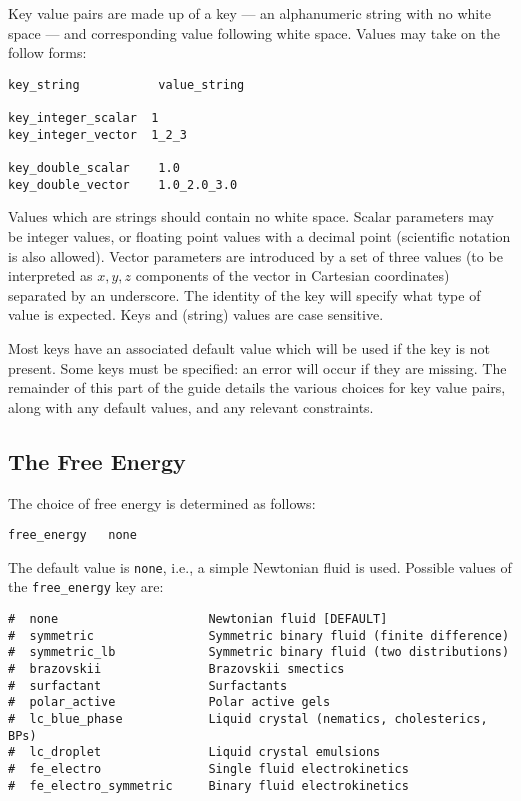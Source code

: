 Key value pairs are made up of a key --- an alphanumeric string with no
white space --- and corresponding value following white space. Values
may take on the follow forms:
\begin{lstlisting}
key_string           value_string

key_integer_scalar  1
key_integer_vector  1_2_3

key_double_scalar    1.0
key_double_vector    1.0_2.0_3.0
\end{lstlisting}
Values which are strings should contain no white space. Scalar parameters
may be integer values, or floating point values with a decimal point
(scientific notation is also allowed).  Vector parameters are introduced
by a set of three values (to be interpreted as $x,y,z$ components of the
vector in Cartesian coordinates) separated by an underscore. The identity
of the key will specify what type of value is expected. Keys and (string)
values are case sensitive.


Most keys have an associated default value which will be used if
the key is not present. Some keys must be specified: an error will
occur if they are missing. The remainder of this part
of the guide details the various choices for key value pairs,
along with any default values, and any relevant constraints.

\subsection{The Free Energy}
\label{input-free-energy}

The choice of free energy is determined as follows:
\begin{lstlisting}
free_energy   none
\end{lstlisting}
The default value is \texttt{none}, i.e., a simple Newtonian fluid is used.
Possible values of the \texttt{free\_energy} key are:
\begin{lstlisting}
#  none                     Newtonian fluid [DEFAULT]
#  symmetric                Symmetric binary fluid (finite difference)
#  symmetric_lb             Symmetric binary fluid (two distributions)
#  brazovskii               Brazovskii smectics
#  surfactant               Surfactants
#  polar_active             Polar active gels
#  lc_blue_phase            Liquid crystal (nematics, cholesterics, BPs)
#  lc_droplet               Liquid crystal emulsions
#  fe_electro               Single fluid electrokinetics
#  fe_electro_symmetric     Binary fluid electrokinetics
\end{lstlisting}

